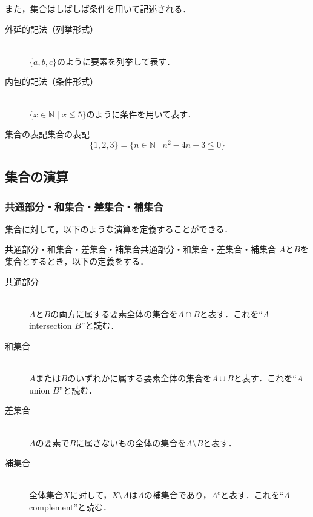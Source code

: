 \documentclass[a4paper,11pt]{ltjsarticle}
\renewcommand{\leq}{\leqq}
\begin{document}
      
      また，集合はしばしば条件を用いて記述される．
      
        \begin{description}
            \item[外延的記法（列挙形式）] \mbox{} \\
            $\{ a, b, c \}$のように要素を列挙して表す．
            \item[内包的記法（条件形式）] \mbox{} \\
            $\{ x \in \mathbb{N} \mid x \leq 5 \}$のように条件を用いて表す．
        \end{description}
      
      
        \begin{example}{集合の表記}{集合の表記}
          \[
          \{ 1,2,3 \} = \{ n \in \mathbb{N} \mid  n^2 -4n +3 \leqq 0 \}
          \]
        \end{example}
      
        \subsection{集合の演算}
        
        \subsubsection{共通部分・和集合・差集合・補集合}
        集合に対して，以下のような演算を定義することができる．
        
        \begin{definition}{共通部分・和集合・差集合・補集合}{共通部分・和集合・差集合・補集合}
            $A$と$B$を集合とするとき，以下の定義をする．
            \begin{description}
              \item[共通部分] \mbox{}\\
              $A$と$B$の両方に属する要素全体の集合を$A \cap B$と表す．これを``$A$ intersection $B$''と読む．
              \item[和集合] \mbox{} \\
              $A$または$B$のいずれかに属する要素全体の集合を$A \cup B$と表す．これを``$A$ union $B$''と読む．
              \item[差集合]\mbox{}\\
              $A$の要素で$B$に属さないもの全体の集合を$A \setminus B$と表す．
              \item[補集合] \mbox{}\\
              全体集合$X$に対して，$X \setminus A$は$A$の補集合であり，$A^c$と表す．これを``$A$ complement''と読む．
            \end{description}
        \end{definition}
        
\end{document}

